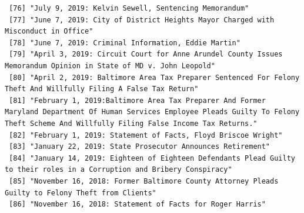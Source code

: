 \documentclass[
  letterpaper,
  DIV=11,
  numbers=noendperiod]{scrreprt}
\begin{document}
\begin{verbatim}
 [76] "July 9, 2019: Kelvin Sewell, Sentencing Memorandum"                                                                                                                                                                                                  
 [77] "June 7, 2019: City of District Heights Mayor Charged with Misconduct in Office"                                                                                                                                                                      
 [78] "June 7, 2019: Criminal Information, Eddie Martin"                                                                                                                                                                                                    
 [79] "April 3, 2019: Circuit Court for Anne Arundel County Issues Memorandum Opinion in State of MD v. John Leopold"                                                                                                                                       
 [80] "April 2, 2019: Baltimore Area Tax Preparer Sentenced For Felony Theft And Willfully Filing A False Tax Return"                                                                                                                                       
 [81] "February 1, 2019:Baltimore Area Tax Preparer And Former Maryland Department Of Human Services Employee Pleads Guilty To Felony Theft Scheme And Willfully Filing False Income Tax Returns."                                                          
 [82] "February 1, 2019: Statement of Facts, Floyd Briscoe Wright"                                                                                                                                                                                          
 [83] "January 22, 2019: State Prosecutor Announces Retirement"                                                                                                                                                                                             
 [84] "January 14, 2019: Eighteen of Eighteen Defendants Plead Guilty to their roles in a Corruption and Bribery Conspiracy"                                                                                                                                
 [85] "November 16, 2018: Former Baltimore County Attorney Pleads Guilty to Felony Theft from Clients"                                                                                                                                                      
 [86] "November 16, 2018: Statement of Facts for Roger Harris"                                                                                                                                                                                              

\end{verbatim}
\end{document}
